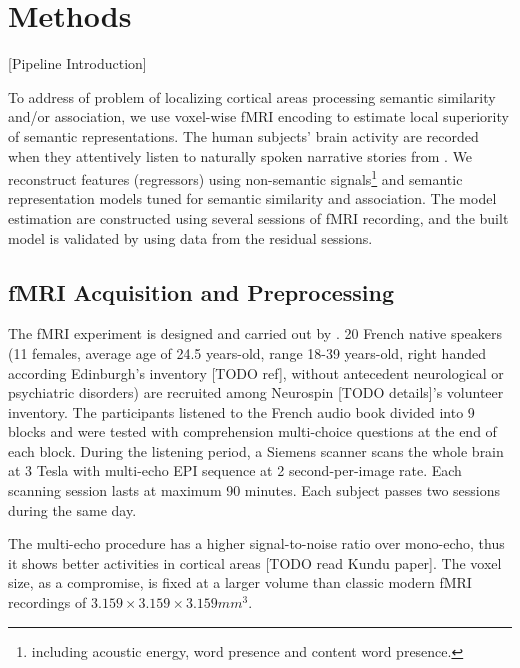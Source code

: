 \chapter{Methods} %

\label{chap:methods} %

[Pipeline Introduction]

To address of problem of localizing cortical areas processing semantic similarity and/or association, we use voxel-wise fMRI encoding to estimate local superiority of semantic representations. The human subjects' brain activity are recorded when they attentively listen to naturally spoken narrative stories from \cite{saint-exuperyPetitPrince1943}. We reconstruct features (regressors) using non-semantic signals\footnote{including acoustic energy, word presence and content word presence.} and semantic representation models tuned for semantic similarity and association. The model estimation are constructed using several sessions of fMRI recording, and the built model is validated by using data from the residual sessions.

\section{fMRI Acquisition and Preprocessing}

The fMRI experiment is designed and carried out by \cite{todorovicAnalysesIRMfLors2018}. 20 French native speakers (11 females, average age of 24.5 years-old, range 18-39 years-old, right handed according Edinburgh's inventory [TODO ref], without antecedent neurological or psychiatric disorders) are recruited among Neurospin [TODO details]'s volunteer inventory. The participants listened to the French audio book \parencite{saint-exuperyLittlePrinceFrench2011} divided into 9 blocks and were tested with comprehension multi-choice questions at the end of each block. During the listening period, a Siemens scanner scans the whole brain at 3 Tesla with multi-echo EPI sequence at 2 second-per-image rate. Each scanning session lasts at maximum 90 minutes. Each subject passes two sessions during the same day. 

The multi-echo procedure has a higher signal-to-noise ratio over mono-echo, thus it shows better activities in cortical areas [TODO read Kundu paper]. The voxel size, as a compromise, is fixed at a larger volume than classic modern fMRI recordings of  \(3.159 \times 3.159 \times 3.159 mm ^ 3\).

